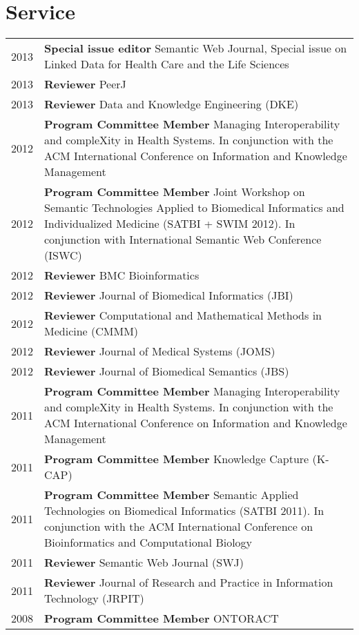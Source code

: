 \documentclass[11pt,fullpage]{article}
\begin{document}
\section*{Service}


\begin{longtable}{p{0.5in}|p{5.5in}}

2013 & {\bf Special issue editor} Semantic Web Journal, Special issue on Linked Data for Health Care and the Life Sciences \\
2013  & \textbf{Reviewer} PeerJ \\
2013  & \textbf{Reviewer} Data and Knowledge Engineering (DKE) \\

2012 & \textbf{Program Committee Member} Managing Interoperability and compleXity in Health Systems. In conjunction with the ACM International Conference on Information and Knowledge Management\\
2012 & \textbf{Program Committee Member} Joint Workshop on Semantic Technologies Applied to Biomedical Informatics and Individualized Medicine (SATBI + SWIM 2012). In conjunction with International Semantic Web Conference (ISWC)\\
2012  & \textbf{Reviewer} BMC Bioinformatics \\
2012  & \textbf{Reviewer} Journal of Biomedical Informatics (JBI) \\
2012  & \textbf{Reviewer} Computational and Mathematical Methods in Medicine (CMMM) \\
2012  & \textbf{Reviewer} Journal of Medical Systems (JOMS) \\
2012  & \textbf{Reviewer} Journal of Biomedical Semantics (JBS) \\
2011 & \textbf{Program Committee Member} Managing Interoperability and compleXity in Health Systems. In conjunction with the ACM International Conference on Information and Knowledge Management\\
2011 & \textbf{Program Committee Member} Knowledge Capture (K-CAP)\\
2011 & \textbf{Program Committee Member} Semantic Applied Technologies on Biomedical Informatics (SATBI 2011). In conjunction with the ACM International Conference on Bioinformatics and Computational Biology\\
2011  & \textbf{Reviewer} Semantic Web Journal (SWJ) \\
2011  & \textbf{Reviewer} Journal of Research and Practice in Information Technology (JRPIT)\\
2008 & \textbf{Program Committee Member} ONTORACT \\

\end{longtable}
\end{document}
